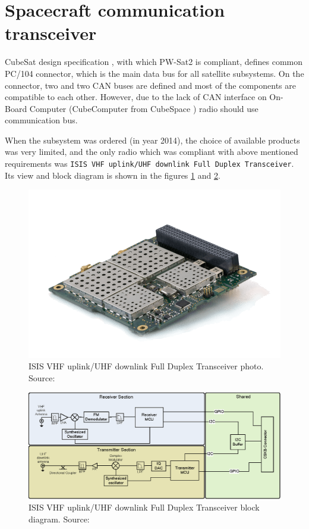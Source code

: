 \section{Spacecraft communication transceiver}
\label{section:comm_design}
CubeSat design specification \cite{cubesat_spec}, with which PW-Sat2 is compliant, defines common PC/104 connector, which is the main data bus for all satellite subsystems. On the connector, two \iic and two CAN buses are defined and most of the components are compatible to each other. However, due to the lack of CAN interface on On-Board Computer (CubeComputer from CubeSpace \cite{cubespace_website}) radio should use \iic communication bus.

When the subsystem was ordered (in year \si{2014}), the choice of available products was very limited, and the only radio which was compliant with above mentioned requirements was \texttt{ISIS VHF uplink/UHF downlink Full Duplex Transceiver}. Its view and block diagram is shown in the figures \ref{ISIS_TRXvU_photo} and \ref{ISIS_TRXvU_block_diagram}.

\begin{figure}
    \centering
    \includegraphics[width=0.5\paperwidth]{img/4/ISIS-radio-UHF-VHF-min.png}
    \caption{ISIS VHF uplink/UHF downlink Full Duplex Transceiver photo. Source: \cite{isis_trxvu}}
    \label{ISIS_TRXvU_photo}
\end{figure}

\begin{figure}
    \centering
    \includegraphics[width=0.8\paperwidth]{img/4/ISIS_TRXvU_block_diagram.eps}
    \caption{ISIS VHF uplink/UHF downlink Full Duplex Transceiver block diagram. Source: \cite{isis_trxvu}}
    \label{ISIS_TRXvU_block_diagram}
\end{figure}

